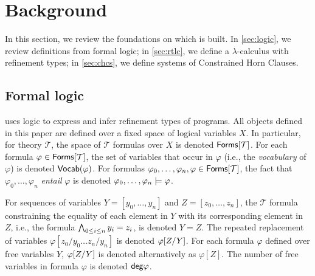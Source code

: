\section{Background}
\label{s:background}
%
In this section, we review the foundations on which \sys is built.
%
In \autoref{sec:logic}, we review definitions from formal logic; %
in \autoref{sec:rtlc}, we define a $\lambda$-calculus with refinement
types; %
in \autoref{sec:chcs}, we define systems of Constrained Horn Clauses.

\subsection{Formal logic}
\label{sec:logic}
%
\sys uses logic to express and infer refinement types of programs.
%
All objects defined in this paper are defined over a fixed space of
logical variables $X$.
%
In particular, for theory $\mathcal{T}$, the space of $\mathcal{T}$
formulas over $X$ is denoted $\tformulas{\mathcal{T}}$.
%
For each formula $\varphi \in \tformulas{\mathcal{T}}$, the set of
variables that occur in $\varphi$ (i.e., the \emph{vocabulary} of
$\varphi$) is denoted $\vocab(\varphi)$.
For formulas $\varphi_0, \ldots, \varphi_n, \varphi \in
\tformulas{\mathcal{T}}$, the fact that $\varphi_0, \ldots, \varphi_n$
\emph{entail} $\varphi$ is denoted $\varphi_0, \ldots, \varphi_n
\entails \varphi$.

For sequences of variables $Y = [ y_0, \ldots, y_n ]$ and $Z = [ z_0,
\ldots, z_n ]$, the $\mathcal{T}$ formula constraining the equality of
each element in $Y$ with its corresponding element in $Z$, i.e., the
formula $\bigland_{0 \leq i \leq n} y_i = z_i$, is denoted $Y = Z$.
%
The repeated replacement of variables $\varphi[ z_0 / y_0 \ldots z_{n}
/ y_{n} ]$ is denoted $\replace{\varphi}{Y}{Z}$.
%
For each formula $\varphi$ defined over free variables $Y$,
$\replace{\varphi}{Y}{Z}$ is denoted alternatively as $\varphi[ Z ]$.
%
The number of free variables in formula $\varphi$ is denoted
$\degreeof{\varphi}$.

